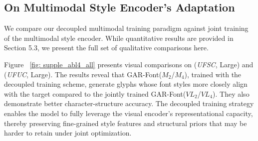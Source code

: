 \subsection{On Multimodal Style Encoder's Adaptation}
We compare our decoupled multimodal training paradigm against joint training of the multimodal style encoder. While quantitative results are provided in Section 5.3, we present the full set of qualitative comparisons here.

Figure ~\ref{fig: supple_abl4_all} presents visual comparisons on (\textit{UFSC}, Large) and (\textit{UFUC}, Large). The results reveal that GAR-Font($M_2$/$M_4$), trained with the decoupled training scheme, generate glyphs whose font styles more closely align with the target compared to the jointly trained GAR-Font($VL_2$/$VL_4$). They also demonstrate better character-structure accuracy. The decoupled training strategy enables the model to fully leverage the visual encoder’s representational capacity, thereby preserving fine-grained style features and structural priors that may be harder to retain under joint optimization.


